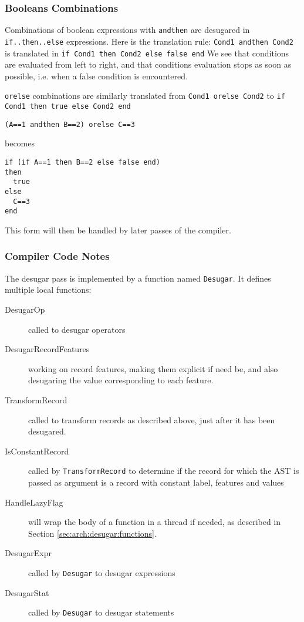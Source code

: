 \documentclass[a4paper]{memoir}
\begin{document}
\subsubsection{Booleans Combinations}
Combinations of boolean expressions with \lstinline!andthen! are desugared in
\lstinline!if..then..else! expressions. Here is the translation
rule:
\lstinline!Cond1 andthen Cond2! is translated in \lstinline!if Cond1 then Cond2 else false end! 
We see that conditions are evaluated from left to right, and that conditions
evaluation stops as soon as possible, i.e. when a false condition is
encountered.

\lstinline!orelse! combinations are similarly translated from \lstinline!Cond1 orelse Cond2! to \lstinline!if Cond1 then true else Cond2 end!  
\begin{lstlisting}
(A==1 andthen B==2) orelse C==3
\end{lstlisting}
becomes

\begin{lstlisting}
if (if A==1 then B==2 else false end)
then
  true
else
  C==3
end
\end{lstlisting}

This form will then be handled by later passes of the compiler.
\subsubsection{Compiler Code Notes}
The desugar pass is implemented by a function named \lstinline!Desugar!. It defines multiple local functions:
\begin{description}
  \item[DesugarOp] called to desugar operators
  \item[DesugarRecordFeatures] working on record features, making them explicit if need be, and also desugaring the value corresponding to each feature.
  \item[TransformRecord] called to transform records as described above, just after it has been desugared.
  \item[IsConstantRecord] called by \lstinline!TransformRecord! to determine if the record for which the AST is passed as argument is a record with constant label, features and values
  \item[HandleLazyFlag] will wrap the body of a function in a thread if needed, as described in Section \ref{sec:arch:desugar:functions}.
  \item[DesugarExpr] called by \lstinline!Desugar! to desugar expressions
  \item[DesugarStat] called by \lstinline!Desugar! to desugar statements
\end{description}
\end{document}
